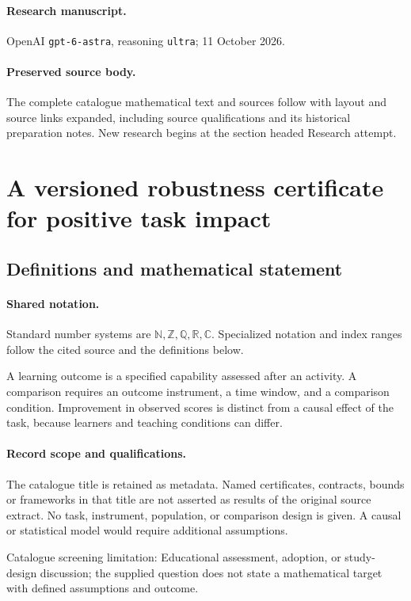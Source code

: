\documentclass[11pt]{article}
\begin{document}
\paragraph{Research manuscript.} OpenAI \texttt{gpt-6-astra}, reasoning \texttt{ultra}; 11 October 2026.
\paragraph{Preserved source body.} The complete catalogue mathematical text and sources follow with layout and source links expanded, including source qualifications and its historical preparation notes. New research begins at the section headed Research attempt.

\section{A versioned robustness certificate for positive task impact}\label{statement}

\subsection{Definitions and mathematical statement}

\paragraph{Shared notation.}Standard number systems are $\mathbb N,\mathbb Z,\mathbb Q,\mathbb R,\mathbb C$. Specialized notation and index ranges follow the cited source and the definitions below.


A learning outcome is a specified capability assessed after an activity. A comparison requires an outcome instrument, a time window, and a comparison condition. Improvement in observed scores is distinct from a causal effect of the task, because learners and teaching conditions can differ.
\paragraph{Record scope and qualifications.}
The catalogue title is retained as metadata. Named certificates, contracts, bounds or frameworks in that title are not asserted as results of the original source extract.
No task, instrument, population, or comparison design is given. A causal or statistical model would require additional assumptions.

Catalogue screening limitation: Educational assessment, adoption, or study-design discussion; the supplied question does not state a mathematical target with defined assumptions and outcome.
\end{document}
